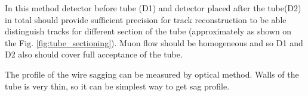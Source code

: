 	In this method detector before tube (D1) and detector placed after the tube(D2) in total should provide sufficient precision for track reconstruction to be able distinguish tracks for different section of the tube (approximately as shown on the Fig. \ref{fig:tube_sectioning}). Muon flow should be homogeneous and so D1 and D2 also should cover full acceptance of the tube.
	
	The profile of the wire sagging can be measured by optical method. Walls of the tube is very thin, so it can be simplest way to get sag profile.
	